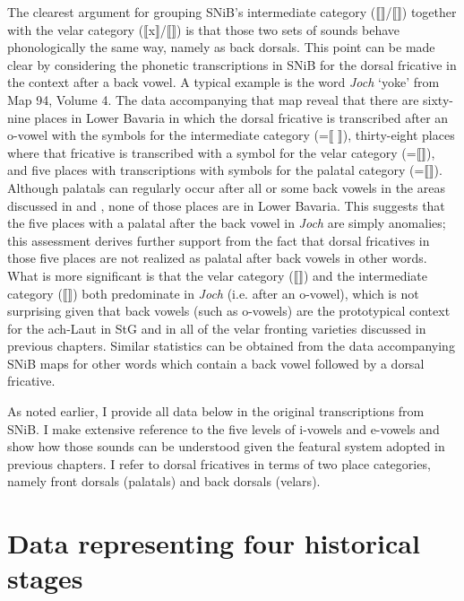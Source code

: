 The clearest argument for grouping SNiB’s intermediate category (⟦⟧/⟦⟧) together with the velar category (⟦x⟧/⟦⟧) is that those two sets of sounds behave phonologically the same way, namely as back dorsals. This point can be made clear by considering the phonetic transcriptions in SNiB for the dorsal fricative in the context after a back vowel. A typical example is the word \textit{Joch}  ‘yoke’ from Map 94, Volume 4. The data accompanying that map reveal that there are sixty-nine places in Lower Bavaria in which the dorsal fricative is transcribed after an o-vowel with the symbols for the intermediate category (=⟦ ⟧), thirty-eight places where that fricative is transcribed with a symbol for the velar category (=⟦⟧), and five places with transcriptions with symbols for the palatal category (=⟦⟧). Although palatals can regularly occur after all or some back vowels in the areas discussed in  and , none of those places are in Lower Bavaria. This suggests that the five places with a palatal after the back vowel in \textit{Joch} are simply anomalies; this assessment derives further support from the fact that dorsal fricatives in those five places are not realized as palatal after back vowels in other words. What is more significant is that the velar category (⟦⟧) and the intermediate category (⟦⟧) both predominate in \textit{Joch} (i.e. after an o-vowel), which is not surprising given that back vowels (such as o-vowels) are the prototypical context for the ach-Laut in StG and in all of the velar fronting varieties discussed in previous chapters. Similar statistics can be obtained from the data accompanying SNiB maps for other words which contain a back vowel followed by a dorsal fricative.

As noted earlier, I provide all data below in the original transcriptions from SNiB. I make extensive reference to the five levels of i-vowels and e-vowels and show how those sounds can be understood given the featural system adopted in previous chapters. I refer to dorsal fricatives in terms of two place categories, namely front dorsals (palatals) and back dorsals (velars).

\section{{Data} {representing} {four} {historical} {stages}}\label{sec:13.3}

